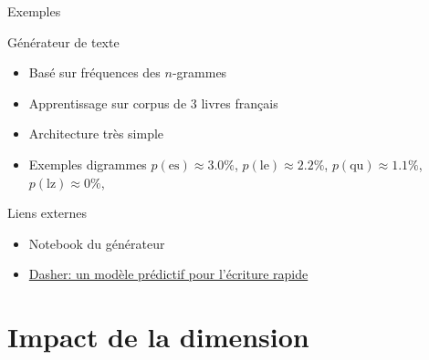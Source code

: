 \documentclass[presentation, aspectratio=169]{beamer}
\begin{document}
\begin{frame}{Exemples}
  \begin{block}{Générateur de texte}
    \begin{itemize}
    \item Basé sur fréquences des $n$-grammes
    \item Apprentissage sur corpus de 3 livres français
    \item Architecture très simple
    \item Exemples digrammes $p(\text{es}) \approx 3.0\%$,
      $p(\text{le}) \approx 2.2\%$, $p(\text{qu}) \approx 1.1\%$,
      $p(\text{lz}) \approx 0\%$,
    \end{itemize}
  \end{block}

  \begin{block}{Liens externes}
    \begin{itemize}
    \item Notebook du générateur
    \item \href{https://www.inference.org.uk/dasher}{Dasher: un modèle
        prédictif pour l'écriture rapide}
    \end{itemize}
  \end{block}
\end{frame}


\section{Impact de la dimension}
\end{document}
